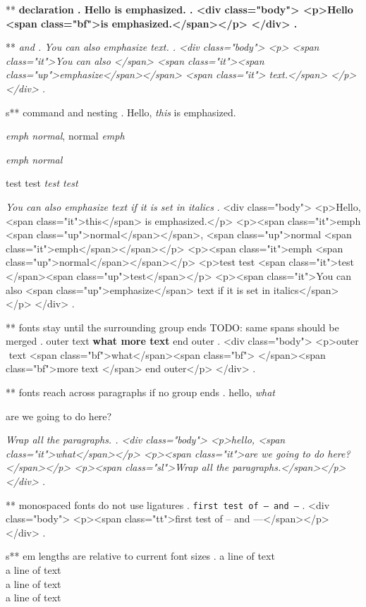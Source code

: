 ** \bfseries declaration
.
Hello \bfseries is emphasized.
.
<div class="body">
<p>Hello <span class="bf">is emphasized.</span></p>
</div>
.


** \em and \emph{}
.
\em You can also \emph{emphasize} text.
.
<div class="body">
<p>
<span class="it">You can also </span>
<span class="it"><span class="up">emphasize</span></span>
<span class="it"> text.</span>
</p>
</div>
.


s** \emph{} command and nesting
.
Hello, \emph{this} is emphasized.

\emph{emph \textup{normal}}, \textup{normal \emph{emph}}

\emph{emph \emph{normal}}

test {test \em\em\em test \em test}

\textit{You can also \emph{emphasize} text if it is set in italics}
.
<div class="body">
<p>Hello, <span class="it">this</span> is emphasized.</p>
<p><span class="it">emph <span class="up">normal</span></span>, <span class="up">normal <span class="it">emph</span></span></p>
<p><span class="it">emph <span class="up">normal</span></span></p>
<p>test test <span class="it">test </span><span class="up">test</span></p>
<p><span class="it">You can also <span class="up">emphasize</span> text if it is set in italics</span></p>
</div>
.


** fonts stay until the surrounding group ends      TODO: same spans should be merged
.
outer { text \bfseries {what} more text } end outer
.
<div class="body">
<p>outer ​ text <span class="bf">what</span><span class="bf">​ </span><span class="bf">more text </span>​ end outer</p>
</div>
.


** fonts reach across paragraphs if no group ends
.
hello, \itshape what

are we going to do here?

\slshape
Wrap all the paragraphs.
.
<div class="body">
<p>hello, <span class="it">what</span></p>
<p><span class="it">are we going to do here?</span></p>
<p><span class="sl">Wrap all the paragraphs.</span></p>
</div>
.


** monospaced fonts do not use ligatures
.
\texttt{first test of -- and ---}
.
<div class="body">
<p><span class="tt">first test of -- and ---</span></p>
</div>
.



s** em lengths are relative to current font sizes
.
\small
a line of text\\[1em]
a line of text\\[1em]
\Huge
a line of text\\[1em]
a line of text

